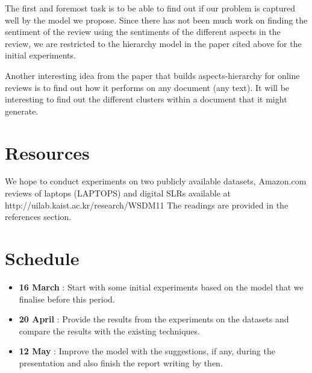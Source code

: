 \documentclass{article}
\begin{document}
The first and foremost task is to be able to find out if our problem is captured well by the model we propose. Since there has not been much work on finding the sentiment of the review using the sentiments of the different aspects in the review, we are restricted to the hierarchy model in the paper cited above for the initial experiments.

Another interesting idea from the paper that builds aspects-hierarchy for online reviews is to find out how it performs on any document (any text). It will be interesting to find out the different clusters within a document that it might generate. 

\section{Resources}
We hope to conduct experiments on two publicly available datasets, Amazon.com reviews of laptops (LAPTOPS) and digital SLRs available at http://uilab.kaist.ac.kr/research/WSDM11 The readings are provided in the references section. 

\section{Schedule}
\begin{itemize}
 \item {\bf 16 March} : Start with some initial experiments based on the model that we finalise before this period.
 \item {\bf 20 April} : Provide the results from the experiments on the datasets and compare the results with the existing techniques.
 \item {\bf 12 May} : Improve the model with the suggestions, if any, during the presentation and also finish the report writing by then.
\end{itemize}




\end{document}
